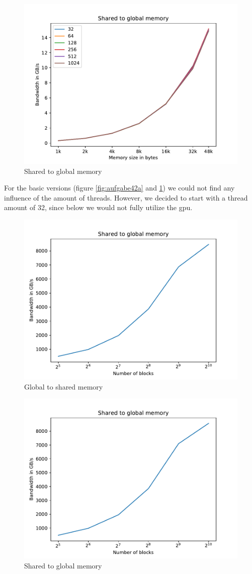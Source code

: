 \documentclass[12pt]{article}
\begin{document}
\begin{figure}
	\centering
	\includegraphics[width=0.7\linewidth]{../../template/plots/aufgabe4_2b}
	\caption{Shared to global memory}
	\label{fig:aufgabe42b}
\end{figure}

For the basic versions (figure \ref{fig:aufgabe42a} and \ref{fig:aufgabe42b}) we could not find any influence of the amount of threads. However, we decided to start with a thread amount of 32, since below we would not fully utilize the gpu.

\begin{figure}
	\centering
	\includegraphics[width=0.7\linewidth]{../../template/plots/aufgabe4_2c}
	\caption{Global to shared memory}
	\label{fig:aufgabe42c}
\end{figure}

\begin{figure}
	\centering
	\includegraphics[width=0.7\linewidth]{../../template/plots/aufgabe4_2d}
	\caption{Shared to global memory}
	\label{fig:aufgabe42d}
\end{figure}
\end{document}
